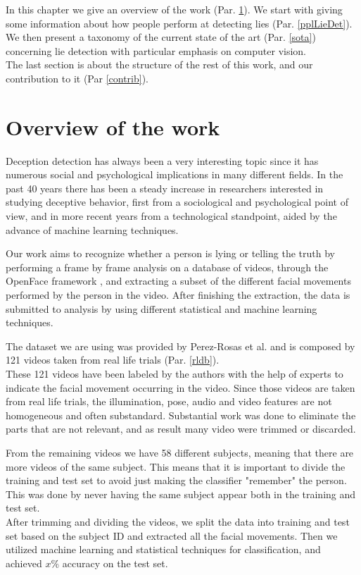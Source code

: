 In this chapter we give an overview of the work (Par. \ref{overview}). We start with giving some information about how people perform at detecting lies (Par. \ref{pplLieDet}). \\
We then present a taxonomy of the current state of the art (Par. \ref{sota}) concerning lie detection with particular emphasis on computer vision. \\
The last section is about the structure of the rest of this work, and our contribution to it (Par \ref{contrib}).

\pagebreak

\section{Overview of the work} \label{overview}
Deception detection has always been a very interesting topic since it has numerous social and psychological implications in many different fields. In the past 40 years there has been a steady increase in researchers interested in studying deceptive behavior, first from a sociological and psychological point of view, and in more recent years from a technological standpoint, aided by the advance of machine learning techniques.

Our work aims to recognize whether a person is lying or telling the truth by performing a frame by frame analysis on a database of videos, through the OpenFace framework \cite{Baltru2018}, and extracting a subset of the different facial movements performed by the person in the video. After finishing the extraction, the data is submitted to analysis by using different statistical and machine learning techniques.

The dataset we are using was provided by Perez-Rosas et al. \cite{Perez-Rosas:2015:DDU:2818346.2820758} and is composed by 121 videos taken from real life trials (Par. \ref{rldb}).\\
These 121 videos have been labeled by the authors with the help of experts to indicate the facial movement occurring in the video. Since those videos are taken from real life trials, the illumination, pose, audio and video features are not homogeneous and often substandard. Substantial work was done to eliminate the parts that are not relevant, and as result many video were trimmed or discarded.

From the remaining videos we have 58 different subjects, meaning that there are more videos of the same subject. This means that it is important to divide the training and test set to avoid just making the classifier "remember" the person. This was done by never having the same subject appear both in the training and test set. \\
After trimming and dividing the videos, we split the data into training and test set based on the subject ID and extracted all the facial movements. Then we utilized machine learning and statistical techniques for classification, and achieved $x \%$ accuracy on the test set.

